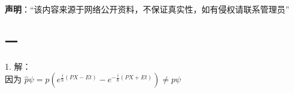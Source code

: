 
\textbf{声明}：“该内容来源于网络公开资料，不保证真实性，如有侵权请联系管理员”


\subsection{一}
1. 解：\\
因为 $\hat{p} \psi = p\left(e^{\frac{i}{\hbar}(PX - Et)} - e^{-\frac{i}{\hbar}(PX + Et)}\right) \neq p\psi$


